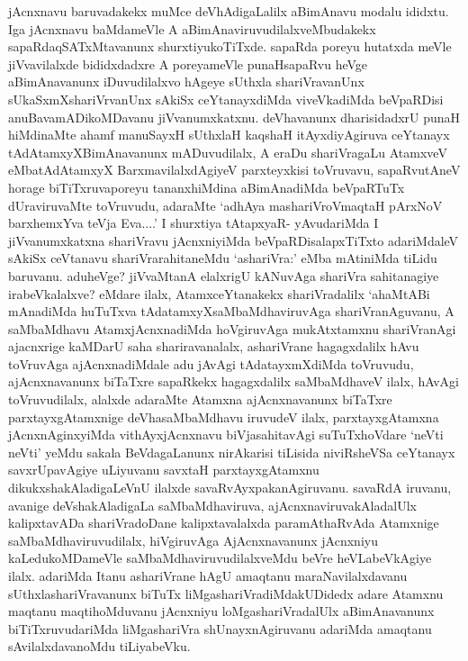 
\begin{artha}
jAcnxnavu baruvadakekx muMce deVhAdigaLalilx aBimAnavu modalu ididxtu. Iga jAcnxnavu baMdameVle A aBimAnaviruvudilalxveMbudakekx sapaRdaqSATxMtavanunx shurxtiyukoTiTxde. sapaRda poreyu hutatxda meVle jiVvavilalxde bididxdadxre A poreyameVle punaHsapaRvu heVge aBimAnavanunx iDuvudilalxvo hAgeye sUthxla shariVravanUnx sUkaSxmXshariVrvanUnx sAkiSx ceYtanayxdiMda viveVkadiMda beVpaRDisi anuBavamADikoMDavanu jiVvanumxkatxnu. deVhavanunx dharisidadxrU punaH hiMdinaMte ahamf manuSayxH sUthxlaH kaqshaH itAyxdiyAgiruva ceYtanayx tAdAtamxyXBimAnavanunx mADuvudilalx, A eraDu shariVragaLu AtamxveV eMbatAdAtamxyX BarxmavilalxdAgiyeV parxteyxkisi toVruvavu, sapaRvutAneV horage biTiTxruvaporeyu tananxhiMdina aBimAnadiMda beVpaRTuTx dUraviruvaMte toVruvudu, adaraMte `adhAya mashariVroV\s maqtaH pArxNoV barxhemxYva teVja Eva....' I shurxtiya tAtapxyaR- yAvudariMda I jiVvanumxkatxna shariVravu jAcnxniyiMda beVpaRDisalapxTiTxto adariMdaleV sAkiSx ceVtanavu shariVrarahitaneMdu `ashariVra:' eMba mAtiniMda tiLidu baruvanu. aduheVge? jiVvaMtanA elalxrigU kANuvAga shariVra sahitanagiye irabeVkalalxve? eMdare ilalx, AtamxceYtanakekx shariVradalilx `ahaMtABi mAnadiMda huTuTxva tAdatamxyXsaMbaMdhaviruvAga  shariVranAguvanu, A saMbaMdhavu AtamxjAcnxnadiMda hoVgiruvAga mukAtxtamxnu shariVranAgi ajacnxrige kaMDarU saha shariravanalalx, ashariVrane  hagagxdalilx hAvu toVruvAga ajAcnxnadiMdale adu jAvAgi tAdatayxmXdiMda toVruvudu, ajAcnxnavanunx biTaTxre sapaRkekx hagagxdalilx saMbaMdhaveV ilalx, hAvAgi toVruvudilalx, alalxde adaraMte Atamxna ajAcnxnavanunx biTaTxre parxtayxgAtamxnige deVhasaMbaMdhavu iruvudeV ilalx, parxtayxgAtamxna jAcnxnAginxyiMda vithAyxjAcnxnavu biVjasahitavAgi suTuTxhoVdare `neVti neVti' yeMdu sakala BeVdagaLanunx nirAkarisi tiLisida niviRsheVSa ceYtanayx savxrUpavAgiye uLiyuvanu savxtaH parxtayxgAtamxnu dikukxshakAladigaLeVnU ilalxde savaRvAyxpakanAgiruvanu. savaRdA iruvanu, avanige deVshakAladigaLa saMbaMdhaviruva, ajAcnxnaviruvakAladalUlx kalipxtavADa shariVradoDane kalipxtavalalxda paramAthaRvAda Atamxnige saMbaMdhaviruvudilalx, hiVgiruvAga AjAcnxnavanunx jAcnxniyu kaLedukoMDameVle saMbaMdhaviruvudilalxveMdu beVre heVLabeVkAgiye ilalx. adariMda Itanu ashariVrane hAgU amaqtanu maraNavilalxdavanu sUthxlashariVravanunx biTuTx liMgashariVradiMdakUDidedx adare Atamxnu maqtanu maqtihoMduvanu jAcnxniyu loMgashariVradalUlx aBimAnavanunx biTiTxruvudariMda liMgashariVra shUnayxnAgiruvanu adariMda amaqtanu sAvilalxdavanoMdu tiLiyabeVku. 
\end{artha}


